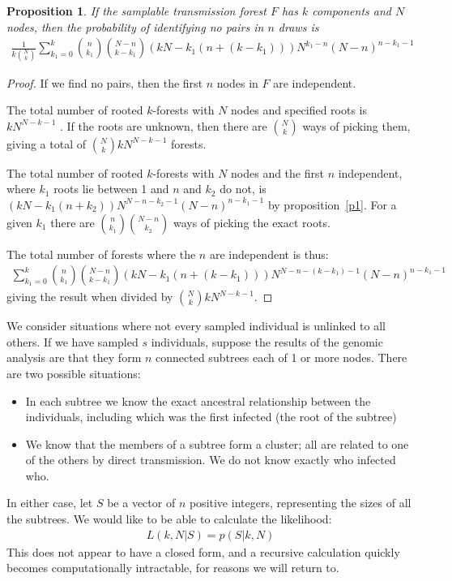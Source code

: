 \documentclass{article}
\newtheorem{proposition}{Proposition}[section]
\begin{document}
\begin{proposition}
    If the samplable transmission forest $F$ has $k$ components and $N$ nodes, then the probability of identifying no pairs in $n$ draws is
        \begin{align*}
        \frac{1}{k{N\choose k}}\sum_{k_1=0}^k {n\choose k_1}{{N-n}\choose k-k_1}(kN - k_1(n+(k-k_1)))N^{k_1-n}(N-n)^{n-k_1-1}
    \end{align*}
\end{proposition}
\begin{proof}
    If we find no pairs, then the first $n$ nodes in $F$ are independent.

    The total number of rooted $k$-forests with $N$ nodes and specified roots is $kN^{N-k-1}$ \cite{Moon1970-li}. If the roots are unknown, then there are ${N\choose k}$ ways of picking them, giving a total of ${N\choose k}kN^{N-k-1}$ forests.

    The total number of rooted $k$-forests with $N$ nodes and the first $n$ independent, where $k_1$ roots lie between 1 and $n$ and $k_2$ do not, is $(kN - k_1(n+k_2))N^{N-n-k_2-1}(N-n)^{n-k_1-1}$ by proposition~\ref{p1}. For a given $k_1$ there are ${n\choose k_1}{{N-n}\choose k_2}$ ways of picking the exact roots.

    The total number of forests where the $n$ are independent is thus:
    \begin{align*}
        \sum_{k_1=0}^k {n\choose k_1}{{N-n}\choose k-k_1}(kN - k_1(n+(k-k_1)))N^{N-n-(k-k_1)-1}(N-n)^{n-k_1-1}
    \end{align*}
    giving the result when divided by ${N\choose k}kN^{N-k-1}$.
\end{proof}

We consider situations where not every sampled individual is unlinked to all others. If we have sampled $s$ individuals, suppose the results of the genomic analysis are that they form $n$ connected subtrees each of 1 or more nodes. There are two possible situations:
\begin{itemize}
    \item In each subtree we know the exact ancestral relationship between the individuals, including which was the first infected (the root of the subtree)
    \item We know that the members of a subtree form a cluster; all are related to one of the others by direct transmission. We do not know exactly who infected who.
\end{itemize}
In either case, let $S$ be a vector of $n$ positive integers, representing the sizes of all the subtrees. We would like to be able to calculate the likelihood:
\begin{align}\label{intractable}
    L(k,N|S) = p(S|k,N)
\end{align}
This does not appear to have a closed form, and a recursive calculation quickly becomes computationally intractable, for reasons we will return to.
\end{document}
